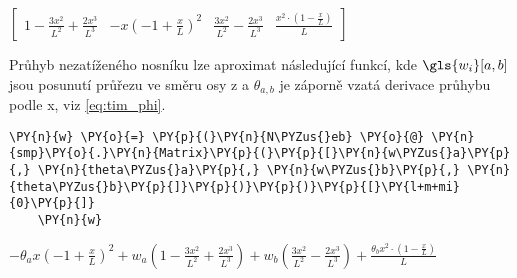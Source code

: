     
    $\displaystyle \left[\begin{matrix}1 - \frac{3 x^{2}}{L^{2}} + \frac{2 x^{3}}{L^{3}} & - x \left(-1 + \frac{x}{L}\right)^{2} & \frac{3 x^{2}}{L^{2}} - \frac{2 x^{3}}{L^{3}} & \frac{x^{2} \cdot \left(1 - \frac{x}{L}\right)}{L}\end{matrix}\right]$

\vspace{0.3cm}
Průhyb nezatíženého nosníku lze aproximat následující funkcí, kde $\gls{w_i}[a, b]$ jsou posunutí průřezu ve směru osy \gls{z} a $\theta_{a,b}$ je záporně vzatá derivace průhybu podle \gls{x}, viz \ref{eq:tim_phi}.
\begin{tcolorbox}[breakable, size=fbox, boxrule=1pt, pad at break*=1mm,colback=cellbackground, colframe=cellborder]
    \begin{Verbatim}[commandchars=\\\{\}]
    \PY{n}{w} \PY{o}{=} \PY{p}{(}\PY{n}{N\PYZus{}eb} \PY{o}{@} \PY{n}{smp}\PY{o}{.}\PY{n}{Matrix}\PY{p}{(}\PY{p}{[}\PY{n}{w\PYZus{}a}\PY{p}{,} \PY{n}{theta\PYZus{}a}\PY{p}{,} \PY{n}{w\PYZus{}b}\PY{p}{,} \PY{n}{theta\PYZus{}b}\PY{p}{]}\PY{p}{)}\PY{p}{)}\PY{p}{[}\PY{l+m+mi}{0}\PY{p}{]}
    \PY{n}{w}
    \end{Verbatim}
\end{tcolorbox}
        
    
    $\displaystyle - \theta_{a} x \left(-1 + \frac{x}{L}\right)^{2} + w_{a} \left(1 - \frac{3 x^{2}}{L^{2}} + \frac{2 x^{3}}{L^{3}}\right) + w_{b} \left(\frac{3 x^{2}}{L^{2}} - \frac{2 x^{3}}{L^{3}}\right) + \frac{\theta_{b} x^{2} \cdot \left(1 - \frac{x}{L}\right)}{L}$
    
